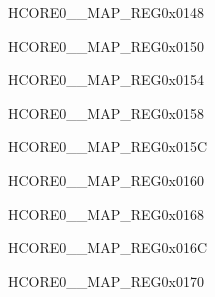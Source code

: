 \begin{register}{H}{CORE0\_\_MAP\_REG}{0x0148}\label{regdesc:CORE0CPUINTFROMCPU3MAPREG}
\end{register}\vspace{-3em}



\begin{register}{H}{CORE0\_\_MAP\_REG}{0x0150}\label{regdesc:CORE0FLASHMSPIINTMAPREG}
\end{register}\vspace{-3em}


\begin{register}{H}{CORE0\_\_MAP\_REG}{0x0154}\label{regdesc:CORE0CSIBRIDGEINTMAPREG}
\end{register}\vspace{-3em}


\begin{register}{H}{CORE0\_\_MAP\_REG}{0x0158}\label{regdesc:CORE0DSIBRIDGEINTMAPREG}
\end{register}\vspace{-3em}


\begin{register}{H}{CORE0\_\_MAP\_REG}{0x015C}\label{regdesc:CORE0CSIINTMAPREG}
\end{register}\vspace{-3em}


\begin{register}{H}{CORE0\_\_MAP\_REG}{0x0160}\label{regdesc:CORE0DSIINTMAPREG}
\end{register}\vspace{-3em}


\begin{register}{H}{CORE0\_\_MAP\_REG}{0x0168}\label{regdesc:CORE0LPIINTMAPREG}
\end{register}\vspace{-3em}


\begin{register}{H}{CORE0\_\_MAP\_REG}{0x016C}\label{regdesc:CORE0PMTINTMAPREG}
\end{register}\vspace{-3em}


\begin{register}{H}{CORE0\_\_MAP\_REG}{0x0170}\label{regdesc:CORE0SBDINTMAPREG}
\end{register}\vspace{-3em}


